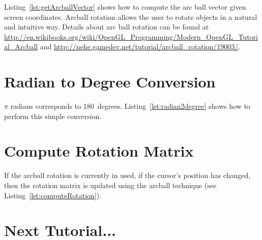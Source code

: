 \documentclass[11pt,oneside,a4paper,final]{article}
\begin{document}
   Listing~\ref{lst:getArcballVector} shows how to compute the arc ball vector given screen coordinates. 
   Arcball rotation allows the user to rotate objects in a natural and intuitive way. 
  Details about arc ball rotation can be found at \url{http://en.wikibooks.org/wiki/OpenGL_Programming/Modern_OpenGL_Tutorial_Arcball} and \url{http://nehe.gamedev.net/tutorial/arcball_rotation/19003/}. 

\begin{center}

\end{center}


\section{Radian to Degree Conversion}
\label{radian2degree}

$\pi$ radians corresponds to 180~degrees. 
Listing~\ref{lst:radian2degree} shows how to perform this simple conversion. 

\begin{center}

\end{center}


\section{Compute Rotation Matrix}
\label{computeRotation}

If the arcball rotation is currently in used, if the cursor's position has changed, then the rotation matrix is updated using the arcball technique
(see Listing~\ref{lst:computeRotation}). 

\begin{center}

\end{center}

	
\section{Next Tutorial...}
\label{sec:Next Tutorial}
\end{document}
